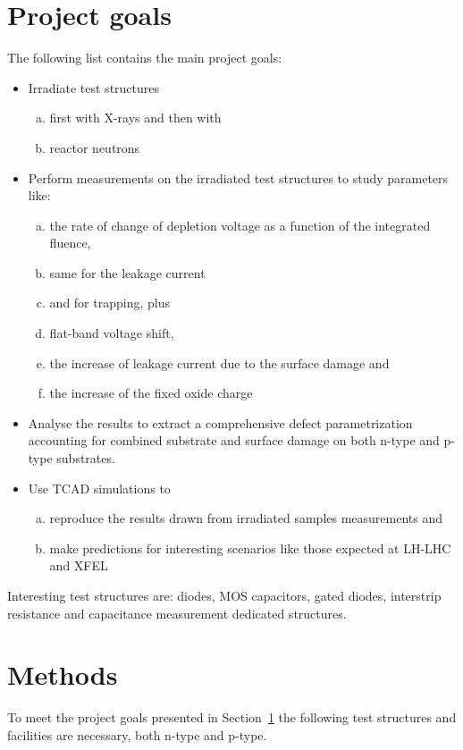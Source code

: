 \documentclass[dvips,12pt]{article}
\begin{document}
\section{Project goals}
\label{sec:goals}
The following list contains the main project goals:
\begin{itemize}
\item Irradiate test structures 
\begin{enumerate}[a)]
\item  first with X-rays and then with 
\item reactor neutrons
\end{enumerate}
\item Perform measurements on the irradiated test structures to study parameters like: 
\begin{enumerate}[a)]
\item the rate of change of depletion voltage  as a function of the integrated fluence,
\item same for the leakage current
\item and for trapping, plus
\item flat-band voltage shift,
\item the increase of leakage current due to the surface damage and
\item the increase of the fixed oxide charge
\end{enumerate}
\item Analyse the results to extract a comprehensive defect parametrization accounting for combined 
substrate and surface damage on both n-type and p-type substrates.
\item Use TCAD simulations to 
\begin{enumerate}[a)] 
\item reproduce the results drawn from irradiated samples measurements and
\item make predictions for interesting scenarios like those expected at LH-LHC and XFEL
\end{enumerate}
\end{itemize}

Interesting test structures are: diodes, MOS capacitors, gated diodes, interstrip resistance and 
capacitance measurement dedicated structures.

\section{Methods}
\label{sec:methods}
To meet the project goals presented in Section~\ref{sec:goals} the following test structures 
and facilities are necessary, both n-type and p-type.
\end{document}
